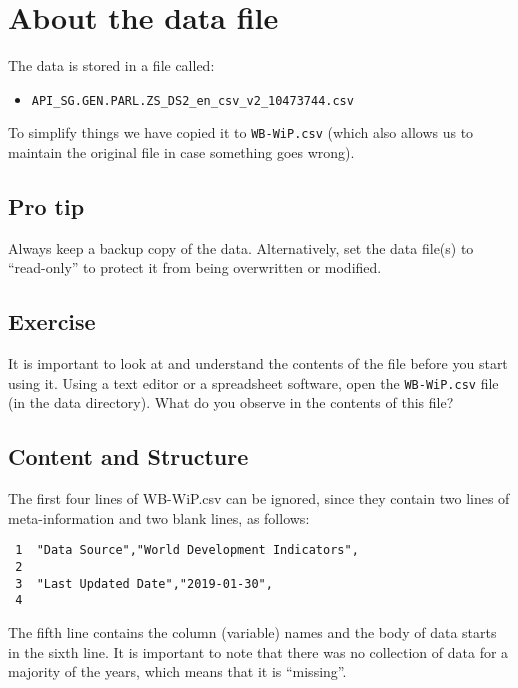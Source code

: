 \documentclass[a4paper,9pt,twocolumn,twoside,printwatermark=true]{pinp}
\providecommand{\tightlist}{%
  \setlength{\itemsep}{0pt}\setlength{\parskip}{0pt}}
\begin{document}
\section{About the data file}\label{about-the-data-file}

The data is stored in a file called:

\begin{itemize}
\tightlist
\item
  \texttt{API\_SG.GEN.PARL.ZS\_DS2\_en\_csv\_v2\_10473744.csv}
\end{itemize}

To simplify things we have copied it to \texttt{WB-WiP.csv} (which also
allows us to maintain the original file in case something goes wrong).

\subsection{Pro tip}\label{pro-tip-1}

Always keep a backup copy of the data. Alternatively, set the data
file(s) to ``read-only'' to protect it from being overwritten or
modified.

\subsection{Exercise}\label{exercise}

It is important to look at and understand the contents of the file
before you start using it. Using a text editor or a spreadsheet
software, open the \texttt{WB-WiP.csv} file (in the data directory).
What do you observe in the contents of this file?

\subsection{Content and Structure}\label{content-and-structure}

The first four lines of WB-WiP.csv can be ignored, since they contain
two lines of meta-information and two blank lines, as follows:

\begin{verbatim}
 1  ﻿"Data Source","World Development Indicators",
 2  
 3  "Last Updated Date","2019-01-30",
 4  
\end{verbatim}

The fifth line contains the column (variable) names and the body of data
starts in the sixth line. It is important to note that there was no
collection of data for a majority of the years, which means that it is
``missing''.
\end{document}
